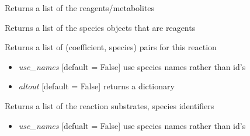 \documentclass[a4paper,11pt,english]{sphinxmanual}
\begin{document}
\begin{fulllineitems}
\begin{fulllineitems}
\end{fulllineitems}


\begin{fulllineitems}
\label{modules_doc:cbmpy.CBModel.Reaction.getSpeciesIds}
Returns a list of the reagents/metabolites

\end{fulllineitems}


\begin{fulllineitems}
\label{modules_doc:cbmpy.CBModel.Reaction.getSpeciesObj}
Returns a list of the species objects that are reagents

\end{fulllineitems}


\begin{fulllineitems}
\label{modules_doc:cbmpy.CBModel.Reaction.getStoichiometry}
Returns a list of (coefficient, species) pairs for this reaction
\begin{itemize}
\item {} 
\emph{use\_names} {[}default = False{]} use species names rather than id's

\item {} 
\emph{altout} {[}default = False{]} returns a dictionary

\end{itemize}

\end{fulllineitems}


\begin{fulllineitems}
\label{modules_doc:cbmpy.CBModel.Reaction.getSubstrateIds}
Returns a list of the reaction substrates, species identifiers
\begin{itemize}
\item {} 
\emph{use\_names} {[}defualt = False{]} use species names rather than id's


\end{itemize}
\end{fulllineitems}
\end{fulllineitems}
\end{document}
